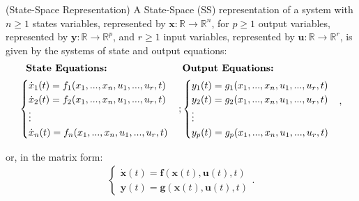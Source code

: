 \documentclass[a4paper,11pt]{book}
\numberwithin{figure}{chapter}
\numberwithin{equation}{chapter}
\numberwithin{table}{chapter}
\theoremstyle{definition}
\newtheorem{definition}{Definition}[chapter]
\newcounter{boxed-theorem}
\newcounter{boxed-lemma}
\newcounter{boxed-definition}
\newenvironment{boxed-definition}[1]
{\colorlet{shadecolor}{pastelYellow!15} \begin{shaded} \begin{definition}{#1}}
{\end{definition} \end{shaded}}
\newcounter{boxed-example}
\begin{document}
\begin{boxed-definition}{(State-Space Representation)} \label{th:SSRepr01}
    A State-Space (SS) representation of a system with $n \geq 1$ states variables, represented by $\bm{x} : \mathbb{R} \rightarrow \mathbb{R}^{n}$, for $p \geq 1$ output variables, represented by $\bm{y} : \mathbb{R} \rightarrow \mathbb{R}^{p}$, and $r \geq 1$ input variables, represented by $\bm{u} : \mathbb{R} \rightarrow \mathbb{R}^{r}$, is given by the systems of state and output equations:
    \begin{align} \label{eq:SSRepr01}
    \begin{split}
    \textbf{State Equations:}\ \ \ \ \ \ \ \ \ \ \ \ \ \ \ \ \ \ \ \ \ \  \hfill & \textbf{ Output Equations:} \hfill \\
    \begin{cases}
        \dot{x}_1(t) = f_1(x_1, ..., x_n, u_1, ..., u_r, t) \\
        \dot{x}_2(t) = f_2(x_1, ..., x_n, u_1, ..., u_r, t) \\
        \vdots \\
        \dot{x}_n(t) = f_n(x_1, ..., x_n, u_1, ..., u_r, t)
    \end{cases} \hfill &;  \begin{cases}
        y_1(t) = g_1(x_1, ..., x_n, u_1, ..., u_r, t) \\
        y_2(t) = g_2(x_1, ..., x_n, u_1, ..., u_r, t) \\
        \vdots \\
        y_p(t) = g_p(x_1, ..., x_n, u_1, ..., u_r, t) \hfill
    \end{cases}
    \end{split}
    ,\end{align}
    
    \noindent or, in the matrix form:
    \begin{align} \label{eq:SSRepr02}
    \begin{cases}
        \dot{\bm{x}}(t) = \bm{f}(\bm{x}(t), \bm{u}(t), t) \\
        \bm{y}(t) = \bm{g}(\bm{x}(t), \bm{u}(t), t)
    \end{cases}
    .\end{align}
\end{boxed-definition}
\end{document}
